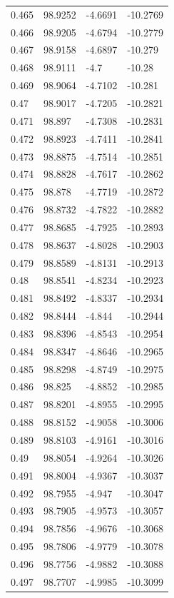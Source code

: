 \begin{tabular}{llll}
0.465 & 98.9252 & -4.6691 & -10.2769 \\
0.466 & 98.9205 & -4.6794 & -10.2779 \\
0.467 & 98.9158 & -4.6897 & -10.279 \\
0.468 & 98.9111 & -4.7 & -10.28 \\
0.469 & 98.9064 & -4.7102 & -10.281 \\
0.47 & 98.9017 & -4.7205 & -10.2821 \\
0.471 & 98.897 & -4.7308 & -10.2831 \\
0.472 & 98.8923 & -4.7411 & -10.2841 \\
0.473 & 98.8875 & -4.7514 & -10.2851 \\
0.474 & 98.8828 & -4.7617 & -10.2862 \\
0.475 & 98.878 & -4.7719 & -10.2872 \\
0.476 & 98.8732 & -4.7822 & -10.2882 \\
0.477 & 98.8685 & -4.7925 & -10.2893 \\
0.478 & 98.8637 & -4.8028 & -10.2903 \\
0.479 & 98.8589 & -4.8131 & -10.2913 \\
0.48 & 98.8541 & -4.8234 & -10.2923 \\
0.481 & 98.8492 & -4.8337 & -10.2934 \\
0.482 & 98.8444 & -4.844 & -10.2944 \\
0.483 & 98.8396 & -4.8543 & -10.2954 \\
0.484 & 98.8347 & -4.8646 & -10.2965 \\
0.485 & 98.8298 & -4.8749 & -10.2975 \\
0.486 & 98.825 & -4.8852 & -10.2985 \\
0.487 & 98.8201 & -4.8955 & -10.2995 \\
0.488 & 98.8152 & -4.9058 & -10.3006 \\
0.489 & 98.8103 & -4.9161 & -10.3016 \\
0.49 & 98.8054 & -4.9264 & -10.3026 \\
0.491 & 98.8004 & -4.9367 & -10.3037 \\
0.492 & 98.7955 & -4.947 & -10.3047 \\
0.493 & 98.7905 & -4.9573 & -10.3057 \\
0.494 & 98.7856 & -4.9676 & -10.3068 \\
0.495 & 98.7806 & -4.9779 & -10.3078 \\
0.496 & 98.7756 & -4.9882 & -10.3088 \\
0.497 & 98.7707 & -4.9985 & -10.3099 \\

\end{tabular}
